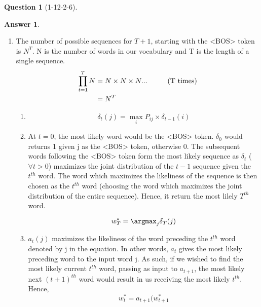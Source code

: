 \documentclass[12pt]{article}
\theoremstyle{definition}
\newtheorem{exercise}{Question}%
\newtheorem{answer}{Answer} %
\newcommand{\Answer}[1]{
\begin{answer}#1\end{answer}
}
\newcommand\tab[1][1cm]{\hspace*{#1}}
\begin{document}
\begin{exercise}[1-12-2-6]
\Answer{
\begin{enumerate}
    \item {
    The number of possible sequences for $T+1$, starting with the <BOS> token is $N^T$. N is the number of words in our vocabulary and T is the length of a single sequence.
    \begin{alignat*}{3}
    \prod_{t=1}^{T} N &= N \times N \times N ... \tab (\text{T times})
    \\
    &= N^T
    \end{alignat*}
    }
    
    \begin{enumerate}
    \item {
    \[\delta_t(j) = \max_i P_{ij} \times \delta_{t-1}(i)\]
    }
    
    \item {
    At $t=0$, the most likely word would be the <BOS> token. $\delta_0$ would  returns 1 given j as the <BOS> token, otherwise 0.
    \bigbreak
    The subsequent words following the <BOS> token form the most likely sequence as $\delta_t$ ($\forall t > 0$) maximizes the joint distribution of the $t-1$ sequence given the $t^{th}$ word. The word which maximizes the likeliness of the sequence is then chosen as the $t^{th}$ word (choosing the word which maximizes the joint distribution of the entire sequence).
    \bigbreak
    Hence, it return the most lilely $T^{th}$ word.
    
    \[w^*_T = \argmax_j \delta_T(j)\]
    }
    
    \item {
    $a_t(j)$ maximizes the likeliness of the word preceding the $t^{th}$ word denoted by j in the equation. In other words, $a_t$ gives the most likely preceding word to the input word j. As such, if we wished to find the most likely current $t^{th}$ word, passing as input to $a_{t+1}$, the most likely next $(t+1)^{th}$ word would result in us receiving the most likely $t^{th}$.
    \bigbreak
    Hence,
    \[w^*_t = a_{t+1}(w^*_{t+1}\]
    }
    \end{enumerate}
\end{enumerate}
}

\end{exercise}
\end{document}
